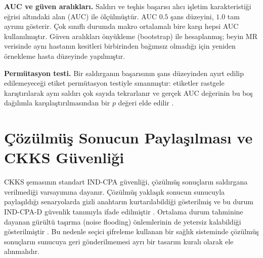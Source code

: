 \textbf{AUC ve güven aralıkları.} Saldırı ve teşhis başarısı alıcı işletim karakteristiği eğrisi altındaki alan (AUC) ile ölçülmüştür. AUC $0.5$ şans düzeyini, $1.0$ tam ayrımı gösterir. Çok sınıflı durumda makro ortalamalı bire karşı hepsi AUC kullanılmıştır. Güven aralıkları önyükleme (bootstrap) ile hesaplanmış; beyin MR verisinde aynı hastanın kesitleri birbirinden bağımsız olmadığı için yeniden örnekleme hasta düzeyinde yapılmıştır.

\textbf{Permütasyon testi.} Bir saldırganın başarısının şans düzeyinden ayırt edilip edilemeyeceği etiket permütasyon testiyle sınanmıştır: etiketler rastgele karıştırılarak aynı saldırı çok sayıda tekrarlanır ve gerçek AUC değerinin bu boş dağılımla karşılaştırılmasından bir $p$ değeri elde edilir \cite{ojala2010permutation}.

\section{Çözülmüş Sonucun Paylaşılması ve CKKS Güvenliği}\label{sec:indcpad}

CKKS şemasının standart IND-CPA güvenliği, çözülmüş sonuçların saldırgana verilmediği varsayımına dayanır. Çözülmüş yaklaşık sonucun sunucuyla paylaşıldığı senaryolarda gizli anahtarın kurtarılabildiği gösterilmiş ve bu durum IND-CPA-D güvenlik tanımıyla ifade edilmiştir \cite{limicciancio2021}. Ortalama durum tahminine dayanan gürültü taşırma (noise flooding) önlemlerinin de yetersiz kalabildiği gösterilmiştir \cite{guo2024keyrecovery}. Bu nedenle seçici şifreleme kullanan bir sağlık sisteminde çözülmüş sonuçların sunucuya geri gönderilmemesi ayrı bir tasarım kuralı olarak ele alınmalıdır.
